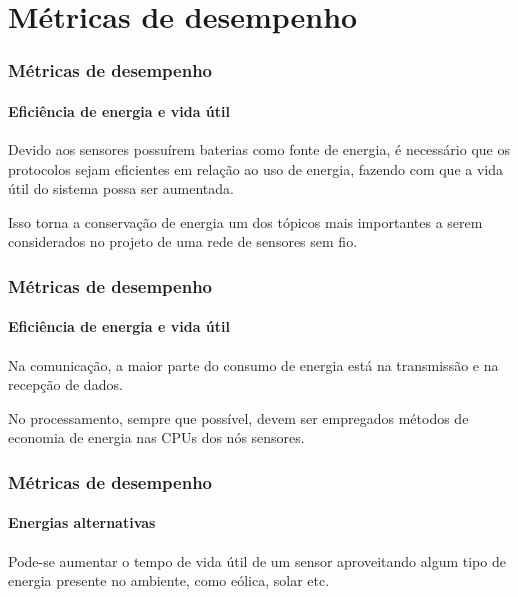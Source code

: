 \documentclass[notes]{beamer}
\begin{document}
\section{Métricas de desempenho}

\begin{frame}
\label{slide_22}
\frametitle{Métricas de desempenho}
\framesubtitle{Eficiência de energia e vida útil}

\begin{block}

Devido aos sensores possuírem baterias como fonte de energia, é necessário que os protocolos sejam eficientes em relação ao uso de energia, fazendo com que a vida útil do sistema possa ser aumentada. 
\end{block} \pause

\begin{alertblock}

Isso torna a conservação de energia um dos tópicos mais importantes a serem considerados no projeto de uma rede de sensores sem fio.

\end{alertblock}

\end{frame}

\begin{frame}
\label{slide_23}
\frametitle{Métricas de desempenho}
\framesubtitle{Eficiência de energia e vida útil}

\begin{block}

Na comunicação, a maior parte do consumo de energia está na transmissão e na recepção de dados. 

\end{block} \pause

\begin{block}

No processamento, sempre que possível, devem ser empregados métodos de economia de energia nas CPUs dos nós sensores.

\end{block}

\end{frame}

\begin{frame}
\label{slide_24}
\frametitle{Métricas de desempenho}
\framesubtitle{Energias alternativas}

\begin{block}

Pode-se aumentar o tempo de vida útil de um sensor aproveitando algum tipo de energia presente no ambiente, como eólica, solar etc. 

\end{block}

\end{frame}
\end{document}
